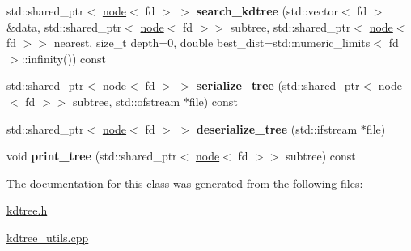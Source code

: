 \begin{DoxyCompactItemize}
std\+::shared\+\_\+ptr$<$ \hyperlink{classnode}{node}$<$ fd $>$ $>$ {\bfseries search\+\_\+kdtree} (std\+::vector$<$ fd $>$ \&data, std\+::shared\+\_\+ptr$<$ \hyperlink{classnode}{node}$<$ fd $>$$>$ subtree, std\+::shared\+\_\+ptr$<$ \hyperlink{classnode}{node}$<$ fd $>$$>$ nearest, size\+\_\+t depth=0, double best\+\_\+dist=std\+::numeric\+\_\+limits$<$ fd $>$\+::infinity()) const
\item 
\mbox{\label{classkdtree_a4e8a0ae6cd7464aa0f4ef0f9fb12d211}} 
std\+::shared\+\_\+ptr$<$ \hyperlink{classnode}{node}$<$ fd $>$ $>$ {\bfseries serialize\+\_\+tree} (std\+::shared\+\_\+ptr$<$ \hyperlink{classnode}{node}$<$ fd $>$$>$ subtree, std\+::ofstream $\ast$file) const
\item 
\mbox{\label{classkdtree_a530cb40f47ab46fb97125028da30744d}} 
std\+::shared\+\_\+ptr$<$ \hyperlink{classnode}{node}$<$ fd $>$ $>$ {\bfseries deserialize\+\_\+tree} (std\+::ifstream $\ast$file)
\item 
\mbox{\label{classkdtree_a21c911f32cabf57ea36f5e8083d53532}} 
void {\bfseries print\+\_\+tree} (std\+::shared\+\_\+ptr$<$ \hyperlink{classnode}{node}$<$ fd $>$$>$ subtree) const
\end{DoxyCompactItemize}


The documentation for this class was generated from the following files\+:\begin{DoxyCompactItemize}
\item 
\hyperlink{kdtree_8h}{kdtree.\+h}\item 
\hyperlink{kdtree__utils_8cpp}{kdtree\+\_\+utils.\+cpp}\end{DoxyCompactItemize}
